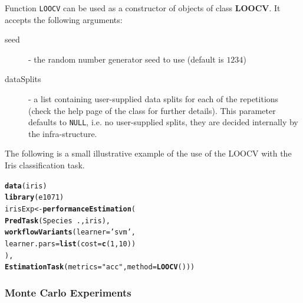 \documentclass[10pt,a4paper]{article}\usepackage[]{graphicx}\usepackage[]{color}
\makeatletter
\newcommand{\hlnum}[1]{\textcolor[rgb]{0.686,0.059,0.569}{#1}}%
\newcommand{\hlstr}[1]{\textcolor[rgb]{0.192,0.494,0.8}{#1}}%
\newcommand{\hlopt}[1]{\textcolor[rgb]{0,0,0}{#1}}%
\newcommand{\hlstd}[1]{\textcolor[rgb]{0.345,0.345,0.345}{#1}}%
\newcommand{\hlkwb}[1]{\textcolor[rgb]{0.69,0.353,0.396}{#1}}%
\newcommand{\hlkwc}[1]{\textcolor[rgb]{0.333,0.667,0.333}{#1}}%
\newcommand{\hlkwd}[1]{\textcolor[rgb]{0.737,0.353,0.396}{\textbf{#1}}}%
\newenvironment{kframe}{%
 \def\at@end@of@kframe{}%
 \ifinner\ifhmode%
  \def\at@end@of@kframe{\end{minipage}}%
  \begin{minipage}{\columnwidth}%
 \fi\fi%
 \def\FrameCommand##1{\hskip\@totalleftmargin \hskip-\fboxsep
 \colorbox{shadecolor}{##1}\hskip-\fboxsep
     \hskip-\linewidth \hskip-\@totalleftmargin \hskip\columnwidth}%
 \MakeFramed {\advance\hsize-\width
   \@totalleftmargin\z@ \linewidth\hsize
   \@setminipage}}%
 {\par\unskip\endMakeFramed%
 \at@end@of@kframe}
\newenvironment{knitrout}{}{} %
\makeatother
\begin{document}
Function \texttt{LOOCV} can be used as a constructor of
objects of class \textbf{LOOCV}. It accepts the following
arguments:

\begin{description}
\item[seed] - the random number generator seed to use (default is $1234$)
\item[dataSplits] - a list containing user-supplied data splits
  for each of the repetitions (check the help page of the
  class for further details). This parameter defaults to
  \texttt{NULL}, i.e. no user-supplied splits, they are decided
  internally by the infra-structure.
\end{description}


The following is a small illustrative example of the use of the
LOOCV with the Iris classification task.

\begin{knitrout}\footnotesize
{}\color{fgcolor}\begin{kframe}
\begin{alltt}
\hlkwd{data}\hlstd{(iris)}
\hlkwd{library}\hlstd{(e1071)}
\hlstd{irisExp} \hlkwb{<-} \hlkwd{performanceEstimation}\hlstd{(}
    \hlkwd{PredTask}\hlstd{(Species} \hlopt{~} \hlstd{.,iris),}
    \hlkwd{workflowVariants}\hlstd{(}\hlkwc{learner}\hlstd{=}\hlstr{'svm'}\hlstd{,}
                     \hlkwc{learner.pars}\hlstd{=}\hlkwd{list}\hlstd{(}\hlkwc{cost}\hlstd{=}\hlkwd{c}\hlstd{(}\hlnum{1}\hlstd{,}\hlnum{10}\hlstd{))}
                     \hlstd{),}
    \hlkwd{EstimationTask}\hlstd{(}\hlkwc{metrics}\hlstd{=}\hlstr{"acc"}\hlstd{,}\hlkwc{method}\hlstd{=}\hlkwd{LOOCV}\hlstd{()))}
\end{alltt}
\end{kframe}
\end{knitrout}


\subsubsection{Monte Carlo Experiments}\label{sec:MC}
\end{document}

